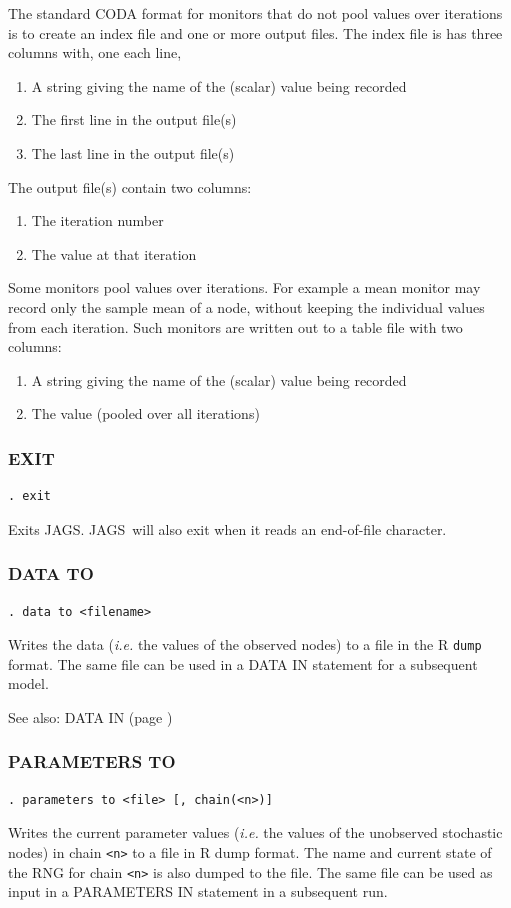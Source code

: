 \documentclass[11pt, a4paper, titlepage]{report}
\newcommand{\JAGS}{\textsf{JAGS}}
\begin{document}
The standard CODA format for monitors that do not pool values over
iterations is to create an index file and one or more output files.
The index file is has three columns with, one each line,
\begin{enumerate}
\item A string giving the name of the (scalar) value being recorded
\item The first line in the output file(s)
\item The last line in the output file(s)
\end{enumerate}
The output file(s) contain two columns:
\begin{enumerate}
\item The iteration number
\item The value at that iteration
\end{enumerate}

Some monitors pool values over iterations. For example a mean monitor
may record only the sample mean of a node, without keeping the
individual values from each iteration. Such monitors are written out
to a table file with two columns:
\begin{enumerate}
\item A string giving the name of the (scalar) value being recorded
\item The value (pooled over all iterations)
\end{enumerate}

\subsubsection{EXIT}

\begin{verbatim}
. exit
\end{verbatim}
Exits \JAGS. \JAGS\ will also exit when it reads an end-of-file character.

\subsubsection{DATA TO}
\label{data:to}
\begin{verbatim}
. data to <filename>
\end{verbatim}
Writes the data ({\em i.e.} the values of the observed nodes) to a
file in the R \texttt{dump} format. The same file can be used in a
DATA IN statement for a subsequent model.

See also: DATA IN (page \pageref{data:in})

\subsubsection{PARAMETERS TO}
\label{parameters:to}
\begin{verbatim}
. parameters to <file> [, chain(<n>)]
\end{verbatim}
Writes the current parameter values ({\em i.e.} the values of the
unobserved stochastic nodes) in chain \texttt{<n>} to a file in R dump
format. The name and current state of the RNG for chain \texttt{<n>}
is also dumped to the file.  The same file can be used as input in a
PARAMETERS IN statement in a subsequent run.
\end{document}
